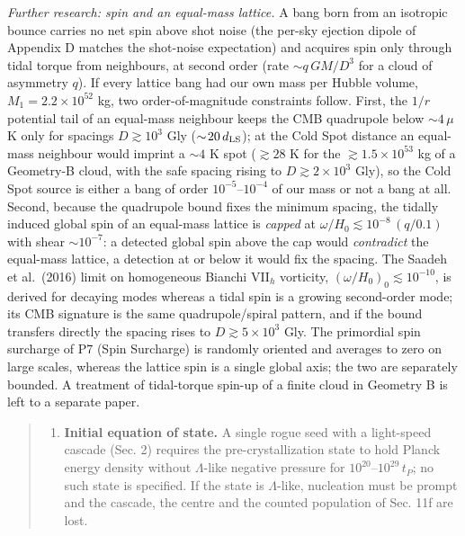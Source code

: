 \documentclass[
  11pt,
]{article}
\providecommand{\tightlist}{%
  \setlength{\itemsep}{0pt}\setlength{\parskip}{0pt}}
\begin{document}
\emph{Further research: spin and an equal-mass lattice.} A bang born
from an isotropic bounce carries no net spin above shot noise (the
per-sky ejection dipole of Appendix D matches the shot-noise
expectation) and acquires spin only through tidal torque from
neighbours, at second order (rate \(\sim q\,GM/D^3\) for a cloud of
asymmetry \(q\)). If every lattice bang had our own mass per Hubble
volume, \(M_1 = 2.2\times10^{52}\) kg, two order-of-magnitude
constraints follow. First, the \(1/r\) potential tail of an equal-mass
neighbour keeps the CMB quadrupole below \(\sim\!4\,\mu\)K only for
spacings \(D \gtrsim 10^3\) Gly (\(\sim\!20\,d_{\rm LS}\)); at the Cold
Spot distance an equal-mass neighbour would imprint a \(\sim\!4\) K spot
(\(\gtrsim 28\) K for the \(\gtrsim 1.5\times10^{53}\) kg of a
Geometry-B cloud, with the safe spacing rising to
\(D \gtrsim 2\times10^3\) Gly), so the Cold Spot source is either a bang
of order \(10^{-5}\)--\(10^{-4}\) of our mass or not a bang at all.
Second, because the quadrupole bound fixes the minimum spacing, the
tidally induced global spin of an equal-mass lattice is \emph{capped} at
\(\omega/H_0 \lesssim 10^{-8}\,(q/0.1)\) with shear \(\sim\!10^{-7}\): a
detected global spin above the cap would \emph{contradict} the
equal-mass lattice, a detection at or below it would fix the spacing.
The Saadeh et al.~(2016) limit on homogeneous Bianchi VII\(_h\)
vorticity, \((\omega/H_0)_0 \lesssim 10^{-10}\), is derived for decaying
modes whereas a tidal spin is a growing second-order mode; its CMB
signature is the same quadrupole/spiral pattern, and if the bound
transfers directly the spacing rises to \(D \gtrsim 5\times10^3\) Gly.
The primordial spin surcharge of P7 (Spin Surcharge) is randomly
oriented and averages to zero on large scales, whereas the lattice spin
is a single global axis; the two are separately bounded. A treatment of
tidal-torque spin-up of a finite cloud in Geometry B is left to a
separate paper.

\begin{quote}
\begin{enumerate}
\def\labelenumi{\arabic{enumi}.}
\setcounter{enumi}{9}
\tightlist
\item
  \textbf{Initial equation of state.} A single rogue seed with a
  light-speed cascade (Sec. 2) requires the pre-crystallization state to
  hold Planck energy density without \(\Lambda\)-like negative pressure
  for \(10^{20}\)--\(10^{29}\,t_P\); no such state is specified. If the
  state is \(\Lambda\)-like, nucleation must be prompt and the cascade,
  the centre and the counted population of Sec. 11f are lost.
\end{enumerate}
\end{quote}
\end{document}
